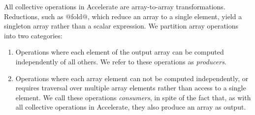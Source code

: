 All collective operations in Accelerate are array-to-array transformations.
Reductions, such as @fold@, which reduce an array to a single element,
yield a singleton array rather than a scalar expression. We partition array
operations into two categories:

\begin{enumerate}
    \item Operations where each element of the output array can be computed
        independently of all others. We refer to these operations as
        \fusion[producer]{}\emph{producers}.

    \item Operations where each array element can not be computed independently,
        or requires traversal over multiple array elements rather than access to
        a single element. We call these operations
        \fusion[consumer]{}\emph{consumers}, in spite of the fact that, as with
        all collective operations in Accelerate, they also produce an array as
        output.

\end{enumerate}

